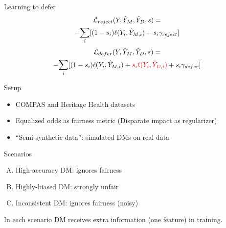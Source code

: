 \documentclass[11pt]{beamer}
\begin{document}
\begin{frame}{Learning to defer \citep{madras2018predict}}
\begin{multline}
  \mathcal{L}_{reject}(Y,\hat{Y}_M, \hat{Y}_D, s) =  \\ 
  - \mathlarger{\sum}\limits_i [(1-s_i) \ell(Y_i, \hat{Y}_{M,i}) + s_i \gamma_{reject}]
\end{multline}
\begin{multline}
  \mathcal{L}_{defer}(Y,\hat{Y}_M, \hat{Y}_D, s) =  \\ 
  - \mathlarger{\sum}\limits_i [(1-s_i) \ell(Y_i, \hat{Y}_{M,i}) + \textcolor{red}{s_i \ell(Y_i, \hat{Y}_{D,i})} + s_i \gamma_{defer}]
\end{multline}
\end{frame}

\begin{frame}{Setup}
\begin{itemize}
    \item COMPAS and Heritage Health datasets
    \item Equalized odds as fairness metric (Disparate impact as regularizer)
    \item ``Semi-synthetic data'': simulated DMs on real data
\end{itemize}
\end{frame}

\begin{frame}{Scenarios}
\begin{enumerate}[A)]
    \item High-accuracy DM: ignores fairness
    \item Highly-biased DM: strongly unfair
    \item Inconsistent DM: ignores fairness (noisy)
\end{enumerate}
In each scenario DM receives extra information (one feature) in training.
\end{frame}
\end{document}
